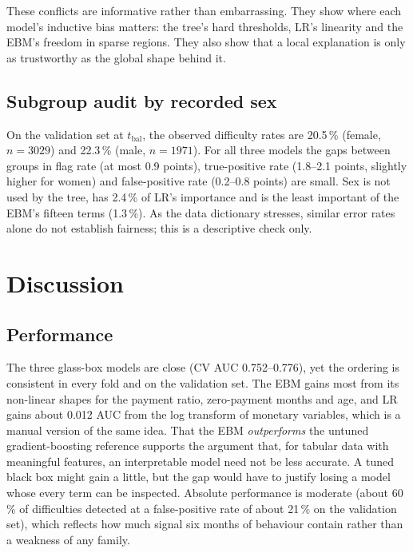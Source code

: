 \documentclass[a4paper,11pt]{article}
\begin{document}
These conflicts are informative rather than embarrassing. They show where each model's inductive bias matters: the tree's hard thresholds, LR's linearity and the EBM's freedom in sparse regions. They also show that a local explanation is only as trustworthy as the global shape behind it.

\subsection{Subgroup audit by recorded sex}
On the validation set at $t_{\text{bal}}$, the observed difficulty rates are 20.5\,\% (female, $n=3029$) and 22.3\,\% (male, $n=1971$). For all three models the gaps between groups in flag rate (at most 0.9 points), true-positive rate (1.8--2.1 points, slightly higher for women) and false-positive rate (0.2--0.8 points) are small. Sex is not used by the tree, has 2.4\,\% of LR's importance and is the least important of the EBM's fifteen terms (1.3\,\%). As the data dictionary stresses, similar error rates alone do not establish fairness; this is a descriptive check only.

\section{Discussion}

\subsection{Performance}
The three glass-box models are close (CV AUC 0.752--0.776), yet the ordering is consistent in every fold and on the validation set. The EBM gains most from its non-linear shapes for the payment ratio, zero-payment months and age, and LR gains about 0.012 AUC from the log transform of monetary variables, which is a manual version of the same idea. That the EBM \emph{outperforms} the untuned gradient-boosting reference supports the argument that, for tabular data with meaningful features, an interpretable model need not be less accurate. A tuned black box might gain a little, but the gap would have to justify losing a model whose every term can be inspected. Absolute performance is moderate (about 60\,\% of difficulties detected at a false-positive rate of about 21\,\% on the validation set), which reflects how much signal six months of behaviour contain rather than a weakness of any family.
\end{document}
